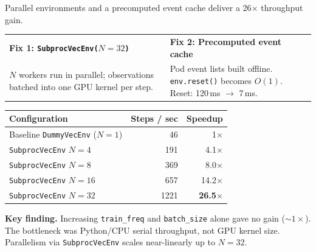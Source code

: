 \documentclass[11pt,aspectratio=43]{beamer}
\begin{document}
\begin{frame}{Parallel environments and a precomputed event cache deliver a 26$\times$ throughput gain.}

  \small
  \begin{tabular}{@{}p{}p{}@{}}
    \textbf{Fix 1: \texttt{SubprocVecEnv($N=32$)}} &
    \textbf{Fix 2: Precomputed event cache} \\
    $N$ workers run in parallel; observations batched into one GPU kernel per step. &
    Pod event lists built offline. \texttt{env.reset()} becomes $O(1)$. Reset: 120\,ms $\to$ 7\,ms. \\
  \end{tabular}

  \vspace{0.3em}

  \begin{center}
  \small
  \begin{tabular}{lrr}
    \toprule
    \textbf{Configuration} & \textbf{Steps / sec} & \textbf{Speedup} \\
    \midrule
    Baseline \texttt{DummyVecEnv} ($N=1$) & 46   & 1$\times$ \\
    \texttt{SubprocVecEnv} $N=4$          & 191  & 4.1$\times$ \\
    \texttt{SubprocVecEnv} $N=8$          & 369  & 8.0$\times$ \\
    \texttt{SubprocVecEnv} $N=16$         & 657  & 14.2$\times$ \\
    \texttt{SubprocVecEnv} $N=32$         & 1221 & \textbf{26.5$\times$} \\
    \bottomrule
  \end{tabular}
  \end{center}

  \vspace{0.2em}
  \begin{block}{}
    \small
    \textbf{Key finding.}
    Increasing \texttt{train\_freq} and \texttt{batch\_size} alone gave no gain (${\sim}1\times$).
    The bottleneck was Python/CPU serial throughput, not GPU kernel size.
    Parallelism via \texttt{SubprocVecEnv} scales near-linearly up to $N=32$.
  \end{block}

\end{frame}

\end{document}
